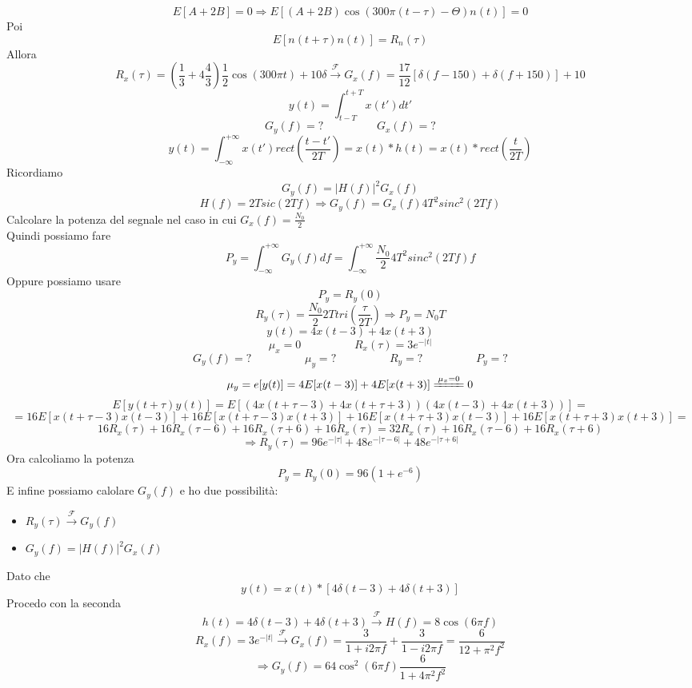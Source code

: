 \documentclass{article}
\newcommand{\trasformata}{\xrightarrow{\mathscr{F}}}
\newcommand{\intfity}{\int_{-\infty}^{+\infty}}
\begin{document}
\[E[A+2B]=0\Rightarrow E[(A+2B)\cos(300\pi(t-\tau)-\Theta)n(t)]=0\]
Poi
\[E[n(t+\tau)n(t)]=R_n(\tau)\]
Allora
\[R_x(\tau)=\left(\frac{1}{3}+4\frac{4}{3}\right)\frac{1}{2}\cos(300\pi t)+10\delta\trasformata G_x(f)=\frac{17}{12}[\delta(f-150)+\delta(f+150)]+10\]
\newpage
\[y(t)=\int_{t-T}^{t+T}x(t')dt'\]
\[G_y(f)=?\hspace{2cm}G_x(f)=?\]
\[y(t)=\int_{-\infty}^{+\infty}x(t')rect\left(\frac{t-t'}{2T}\right)=x(t)*h(t)=x(t)*rect\left(\frac{t}{2T}\right)\]
Ricordiamo
\[G_y(f)=|H(f)|^2G_x(f)\]
\[H(f)=2Tsic(2Tf)\Rightarrow G_y(f)=G_x(f)4T^2sinc^2(2Tf)\]
Calcolare la potenza del segnale nel caso in cui \(G_x(f)=\frac{N_0}{2}\)\\
Quindi possiamo fare
\[P_y=\intfity G_y(f)df=\intfity \frac{N_0}{2}4T^2sinc^2(2Tf)f\]
Oppure possiamo usare
\[P_y=R_y(0)\]
\[R_y(\tau)=\frac{N_0}{2}2Ttri\left(\frac{\tau}{2T}\right)\Rightarrow P_y=N_0T\]
\newpage
\[y(t)=4x(t-3)+4x(t+3)\]
\[\mu_x=0\hspace{2cm}R_x(\tau)=3e^{-|t|}\]
\[G_y(f)=?\hspace{2cm}\mu_y=?\hspace{2cm}R_y=?\hspace{2cm}P_y=?\]
\[\mu_y=e[y(t)]=4E[x(t-3)]+4E[x(t+3)]\xlongequal{\mu_x=0}0\]
\[E[y(t+\tau)y(t)]=E[(4x(t+\tau-3)+4x(t+\tau+3))(4x(t-3)+4x(t+3))]=\]
\[=16E[x(t+\tau-3)x(t-3)]+16E[x(t+\tau-3)x(t+3)]+16E[x(t+\tau+3)x(t-3)]+16E[x(t+\tau+3)x(t+3)]=\]
\[16R_x(\tau)+16R_x(\tau-6)+16R_x(\tau+6)+16R_x(\tau)=32R_x(\tau)+16R_x(\tau-6)+16R_x(\tau+6)\]
\[\Rightarrow R_y(\tau)=96e^{-|\tau|}+48e^{-|\tau-6|}+48e^{-|\tau+6|}\]
Ora calcoliamo la potenza
\[P_y=R_y(0)=96(1+e^{-6})\]
E infine possiamo calolare \(G_y(f)\) e ho due possibilità:
\begin{itemize}
    \item \(R_y(\tau)\trasformata G_y(f)\)
    \item \(G_y(f)=|H(f)|^2G_x(f)\)
\end{itemize}
Dato che
\[y(t)=x(t)*[4\delta(t-3)+4\delta(t+3)]\]
Procedo con la seconda
\[h(t)=4\delta(t-3)+4\delta(t+3)\trasformata H(f)=8\cos(6\pi f)\]
\[R_x(f)=3e^{-|t|}\trasformata G_x(f)=\frac{3}{1+i2\pi f}+\frac{3}{1-i2\pi f}=\frac{6}{12+\pi^2f^2}\]
\[\Rightarrow G_y(f)=64\cos^2(6\pi f)\frac{6}{1+4\pi^2f^2}\]
\end{document}
